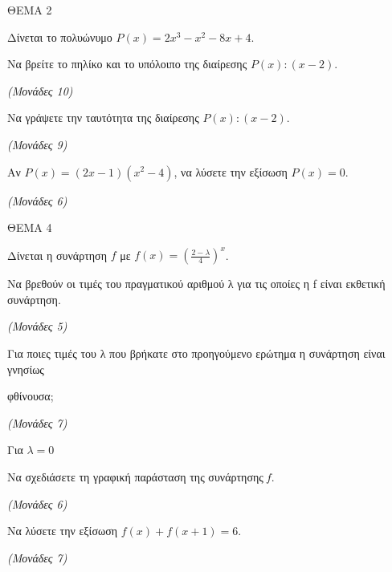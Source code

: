 \documentclass[11pt,a4paper,twoside]{book}
\newcommand{\monades}[1]{\hfill \textit{(Μονάδες #1)}}
\begin{document}
\vspace{4mm}

ΘΕΜΑ 2

Δίνεται το πολυώνυμο $P(x) = 2x^3 - x^2 - 8x + 4$.

\begin{alist}
\item

\begin{rlist}
\item Να βρείτε το πηλίκο και το υπόλοιπο της διαίρεσης $P(x) : (x - 2)$.

\monades{10}

\item Να γράψετε την ταυτότητα της διαίρεσης $P(x) : (x - 2)$.

\monades{9}

\end{rlist}
\item Αν $P(x) = (2x - 1)(x^2 - 4)$, να λύσετε την εξίσωση $P(x) = 0$.

\monades{6}
\end{alist}

\vspace{4mm}

ΘΕΜΑ 4

Δίνεται η συνάρτηση $f$ με $f(x) = {(\frac{2 - \lambda}{4})}^{x}$.

\begin{alist}
\item Να βρεθούν οι τιμές του πραγματικού αριθμού λ για τις οποίες η f είναι εκθετική συνάρτηση.

\monades{5}

\item Για ποιες τιμές του λ που βρήκατε στο προηγούμενο ερώτημα η συνάρτηση είναι γνησίως

φθίνουσα;

\monades{7}

\item Για $\lambda = 0$

\begin{rlist}
\item Nα σχεδιάσετε τη γραφική παράσταση της συνάρτησης$\ f.$

\monades{6}

\item Να λύσετε την εξίσωση $f(x) + f(x + 1) = 6.$

\monades{7}
\end{rlist}
\end{alist}
\end{document}
